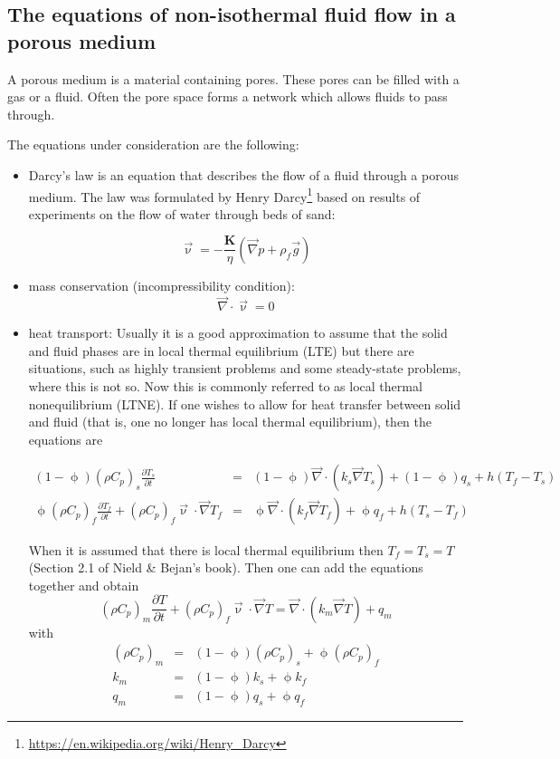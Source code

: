 \subsection{The equations of non-isothermal fluid flow in a porous medium}

A porous medium is a material containing pores. These pores can 
be filled with a gas or a fluid. Often the pore space forms a network which allows fluids to pass through.

The equations under consideration are the following:
\begin{itemize}
\item Darcy's law is an equation that describes the flow of a fluid through a porous medium. The law was formulated by Henry Darcy\footnote{\url{https://en.wikipedia.org/wiki/Henry_Darcy}}
based on results of experiments on the flow of water through beds of sand:

\begin{equation}
\vec{\upnu} = -\frac{{\bm K}}{\eta} (\vec\nabla p + \rho_f \vec{g})
\label{eq:darcy}
\end{equation}


\item mass conservation (incompressibility condition):
\begin{equation}
\vec\nabla\cdot\vec\upnu = 0
\label{eq:porous:incomp}
\end{equation}
\item heat transport:
Usually it is a good approximation to assume that the solid and fluid phases are in local
thermal equilibrium (LTE) but there are situations, such as highly transient problems and
some steady-state problems, where this is not so. Now this is commonly referred to as local thermal nonequilibrium (LTNE). If one wishes to allow for heat transfer between solid and fluid (that is, one no longer has local thermal equilibrium), then the equations are

\begin{eqnarray}
(1-\upphi)(\rho C_p)_s \frac{\partial T_s}{\partial t}
&=& (1-\upphi) \vec\nabla \cdot (k_s \vec\nabla T_s)
+ (1-\upphi) q_s + h (T_f-T_s) \\
\upphi (\rho C_p)_f  \frac{\partial T_f}{\partial t}
+ (\rho C_p)_f \vec\upnu \cdot \vec\nabla T_f 
&=& \upphi \vec\nabla \cdot (k_f \vec\nabla T_f)
+ \upphi q_f + h (T_s-T_f)
\end{eqnarray}

When it is assumed that there is local thermal equilibrium then $T_f=T_s=T$ (Section 2.1 of Nield \& Bejan's book). 
Then one can add the equations together and obtain 
\[
(\rho C_p)_m \frac{\partial T}{\partial t} 
+
(\rho C_p)_f \vec{\upnu} \cdot \vec\nabla T 
= 
\vec\nabla \cdot ( k_m \vec\nabla T)
+ q_m
\]
with 
\begin{eqnarray}
(\rho C_p)_m &=& (1-\upphi) (\rho C_p)_s + \upphi (\rho C_p)_ f\\ k_m &=& (1-\upphi) k_s + \upphi k_f \\
q_m &=& (1-\upphi) q_s + \upphi q_f 
\end{eqnarray}


\end{itemize}
